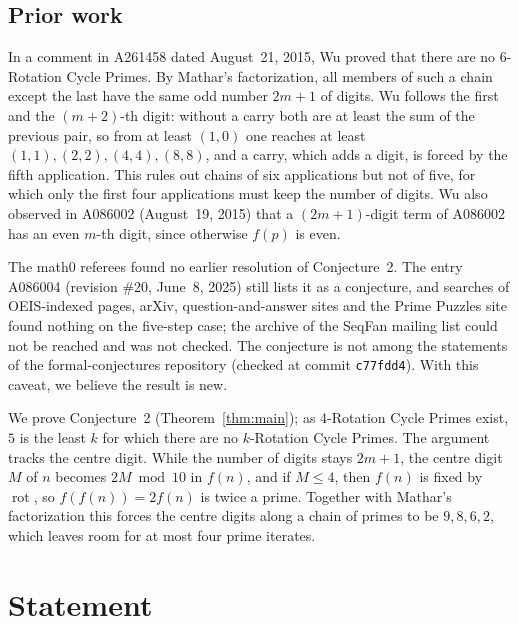 \documentclass[11pt]{amsart}
\theoremstyle{plain}
\theoremstyle{definition}
\DeclareMathOperator{\rot}{rot}
\begin{document}
\subsection*{Prior work}
In a comment in A261458 dated August~21, 2015, Wu proved that there are no 6-Rotation Cycle Primes. By Mathar's factorization, all members of such a chain except the last have the same odd number $2m+1$ of digits. Wu follows the first and the $(m+2)$-th digit: without a carry both are at least the sum of the previous pair, so from at least $(1,0)$ one reaches at least $(1,1),(2,2),(4,4),(8,8)$, and a carry, which adds a digit, is forced by the fifth application. This rules out chains of six applications but not of five, for which only the first four applications must keep the number of digits. Wu also observed in A086002 (August~19, 2015) that a $(2m+1)$-digit term of A086002 has an even $m$-th digit, since otherwise $f(p)$ is even.

The math0 referees found no earlier resolution of Conjecture~2. The entry A086004 (revision \#20, June~8, 2025) still lists it as a conjecture, and searches of OEIS-indexed pages, arXiv, question-and-answer sites and the Prime Puzzles site found nothing on the five-step case; the archive of the SeqFan mailing list could not be reached and was not checked. The conjecture is not among the statements of the formal-conjectures repository \cite{FC} (checked at commit \texttt{c77fdd4}). With this caveat, we believe the result is new.

We prove Conjecture~2 (Theorem~\ref{thm:main}); as 4-Rotation Cycle Primes exist, $5$ is the least $k$ for which there are no $k$-Rotation Cycle Primes. The argument tracks the centre digit. While the number of digits stays $2m+1$, the centre digit $M$ of $n$ becomes $2M\bmod10$ in $f(n)$, and if $M\le4$, then $f(n)$ is fixed by $\rot$, so $f(f(n))=2f(n)$ is twice a prime. Together with Mathar's factorization this forces the centre digits along a chain of primes to be $9,8,6,2$, which leaves room for at most four prime iterates.

\section{Statement}\label{sec:statement}
\end{document}
